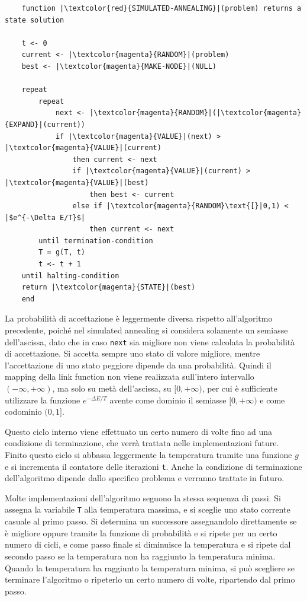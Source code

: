 \documentclass{article}
\numberwithin{equation}{subsection}
\begin{document}
\begin{verbatim}
    function |\textcolor{red}{SIMULATED-ANNEALING}|(problem) returns a state solution

    t <- 0
    current <- |\textcolor{magenta}{RANDOM}|(problem)
    best <- |\textcolor{magenta}{MAKE-NODE}|(NULL)

    repeat
        repeat
            next <- |\textcolor{magenta}{RANDOM}|(|\textcolor{magenta}{EXPAND}|(current))
            if |\textcolor{magenta}{VALUE}|(next) > |\textcolor{magenta}{VALUE}|(current) 
                then current <- next
                if |\textcolor{magenta}{VALUE}|(current) > |\textcolor{magenta}{VALUE}|(best)   
                    then best <- current
                else if |\textcolor{magenta}{RANDOM}\text{[}|0,1) < |$e^{-\Delta E/T}$| 
                    then current <- next
        until termination-condition
        T = g(T, t)
        t <- t + 1
    until halting-condition
    return |\textcolor{magenta}{STATE}|(best)
    end
\end{verbatim}

La probabilità di accettazione è leggermente diversa rispetto all'algoritmo precedente, poiché nel simulated annealing si considera solamente un semiasse dell'ascissa, dato che in caso \verb|next| sia migliore non viene calcolata la probabilità di accettazione. Si accetta sempre 
uno stato di valore migliore, mentre l'accettazione di uno stato peggiore dipende da una probabilità. 
Quindi il mapping della link function non viene realizzata sull'intero intervallo $(-\infty,+\infty)$, ma solo su metà dell'ascissa, su $[0,+\infty)$, per cui è 
sufficiente utilizzare la funzione $e^{-\Delta E/T}$ avente come dominio il semiasse $[0,+\infty)$ e come codominio $(0,1]$. 

Questo ciclo interno viene effettuato un certo numero di volte fino ad una condizione di 
terminazione, che verrà trattata nelle implementazioni future. 
Finito questo ciclo si abbassa leggermente la temperatura tramite una funzione $g$ e si incrementa il contatore 
delle iterazioni \verb|t|. 
Anche la condizione di terminazione dell'algoritmo dipende dallo specifico problema 
e verranno trattate in futuro. 


Molte implementazioni dell'algoritmo seguono la stessa sequenza di passi. Si assegna la variabile \verb|T| alla temperatura massima, e si sceglie uno stato corrente 
casuale al primo passo. Si determina un successore assegnandolo direttamente se è migliore oppure tramite la funzione di probabilità e si ripete per un certo numero di 
cicli, e come passo finale si diminuisce la temperatura e si ripete dal secondo passo se la temperatura non ha 
raggiunto la temperatura minima. Quando la temperatura ha raggiunto la temperatura minima, si può scegliere se terminare l'algoritmo o ripeterlo un certo numero di 
volte, ripartendo dal primo passo. 
\end{document}
